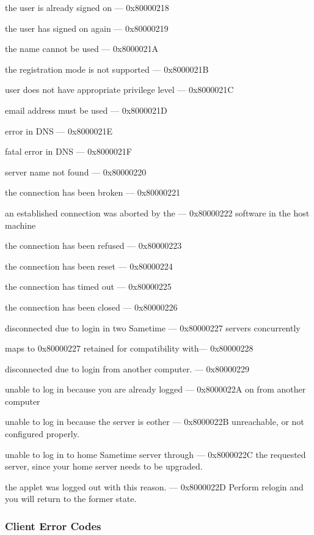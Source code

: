 \documentclass[titlepage,oneside]{book}
\begin{document}
the user is already signed on                     --- 0x80000218

the user has signed on again                      --- 0x80000219

the name cannot be used                           --- 0x8000021A

the registration mode is not supported            --- 0x8000021B

user does not have appropriate privilege level    --- 0x8000021C

email address must be used                        --- 0x8000021D

error in DNS                                      --- 0x8000021E

fatal error in DNS                                --- 0x8000021F

server name not found                             --- 0x80000220

the connection has been broken                    --- 0x80000221

an established connection was aborted by the      --- 0x80000222
software in the host machine

the connection has been refused                   --- 0x80000223

the connection has been reset                     --- 0x80000224

the connection has timed out                      --- 0x80000225

the connection has been closed                    --- 0x80000226

disconnected due to login in two Sametime         --- 0x80000227
servers concurrently

maps to 0x80000227 retained for compatibility with--- 0x80000228

disconnected due to login from another computer.  --- 0x80000229

unable to log in because you are already logged   --- 0x8000022A
on from another computer

unable to log in because the server is eother     --- 0x8000022B
unreachable, or not configured properly.

unable to log in to home Sametime server through  --- 0x8000022C
the requested server, since your home server
needs to be upgraded.

the applet was logged out with this reason.       --- 0x8000022D
Perform relogin and you will return to the
former state.

\subsubsection{Client Error Codes}
\end{document}
